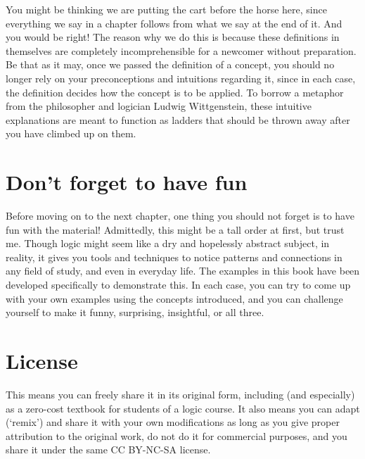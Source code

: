You might be thinking we are putting the cart before the horse here, since everything we say in a chapter follows from what we say at the end of it. And you would be right! The reason why we do this is because these definitions in themselves are completely incomprehensible for a newcomer without preparation. Be that as it may, once we passed the definition of a concept, you should no longer rely on your preconceptions and intuitions regarding it, since in each case, the definition decides how the concept is to be applied. To borrow a metaphor from the philosopher and logician Ludwig Wittgenstein, these intuitive explanations are meant to function as ladders that should be thrown away after you have climbed up on them. 

\section*{Don't forget to have fun}

Before moving on to the next chapter, one thing you should not forget is to have fun with the material! Admittedly, this might be a tall order at first, but trust me. Though logic might seem like a dry and hopelessly abstract subject, in reality, it gives you tools and techniques to notice patterns and connections in any field of study, and even in everyday life. The examples in this book have been developed specifically to demonstrate this. In each case, you can try to come up with your own examples using the concepts introduced, and you can challenge yourself to make it funny, surprising, insightful, or all three. 

\section*{License}

\doclicenseThis

\noindent This means you can freely share it in its original form, including (and especially) as a zero-cost textbook for students of a logic course. It also means you can adapt (`remix')  and share it with your own modifications as long as you give proper attribution to the original work, do not do it for commercial purposes, and you share it under the same \textsf{CC BY-NC-SA} license. 